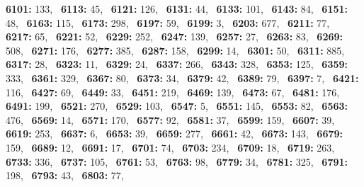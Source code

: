 \textbf{6101:} 133,\allowbreak~ 
\textbf{6113:} 45,\allowbreak~ 
\textbf{6121:} 126,\allowbreak~ 
\textbf{6131:} 44,\allowbreak~ 
\textbf{6133:} 101,\allowbreak~ 
\textbf{6143:} 84,\allowbreak~ 
\textbf{6151:} 48,\allowbreak~ 
\textbf{6163:} 115,\allowbreak~ 
\textbf{6173:} 298,\allowbreak~ 
\textbf{6197:} 59,\allowbreak~ 
\textbf{6199:} 3,\allowbreak~ 
\textbf{6203:} 677,\allowbreak~ 
\textbf{6211:} 77,\allowbreak~ 
\textbf{6217:} 65,\allowbreak~ 
\textbf{6221:} 52,\allowbreak~ 
\textbf{6229:} 252,\allowbreak~ 
\textbf{6247:} 139,\allowbreak~ 
\textbf{6257:} 27,\allowbreak~ 
\textbf{6263:} 83,\allowbreak~ 
\textbf{6269:} 508,\allowbreak~ 
\textbf{6271:} 176,\allowbreak~ 
\textbf{6277:} 385,\allowbreak~ 
\textbf{6287:} 158,\allowbreak~ 
\textbf{6299:} 14,\allowbreak~ 
\textbf{6301:} 50,\allowbreak~ 
\textbf{6311:} 885,\allowbreak~ 
\textbf{6317:} 28,\allowbreak~ 
\textbf{6323:} 11,\allowbreak~ 
\textbf{6329:} 24,\allowbreak~ 
\textbf{6337:} 266,\allowbreak~ 
\textbf{6343:} 328,\allowbreak~ 
\textbf{6353:} 125,\allowbreak~ 
\textbf{6359:} 333,\allowbreak~ 
\textbf{6361:} 329,\allowbreak~ 
\textbf{6367:} 80,\allowbreak~ 
\textbf{6373:} 34,\allowbreak~ 
\textbf{6379:} 42,\allowbreak~ 
\textbf{6389:} 79,\allowbreak~ 
\textbf{6397:} 7,\allowbreak~ 
\textbf{6421:} 116,\allowbreak~ 
\textbf{6427:} 69,\allowbreak~ 
\textbf{6449:} 33,\allowbreak~ 
\textbf{6451:} 219,\allowbreak~ 
\textbf{6469:} 139,\allowbreak~ 
\textbf{6473:} 67,\allowbreak~ 
\textbf{6481:} 176,\allowbreak~ 
\textbf{6491:} 199,\allowbreak~ 
\textbf{6521:} 270,\allowbreak~ 
\textbf{6529:} 103,\allowbreak~ 
\textbf{6547:} 5,\allowbreak~ 
\textbf{6551:} 145,\allowbreak~ 
\textbf{6553:} 82,\allowbreak~ 
\textbf{6563:} 476,\allowbreak~ 
\textbf{6569:} 14,\allowbreak~ 
\textbf{6571:} 170,\allowbreak~ 
\textbf{6577:} 92,\allowbreak~ 
\textbf{6581:} 37,\allowbreak~ 
\textbf{6599:} 159,\allowbreak~ 
\textbf{6607:} 39,\allowbreak~ 
\textbf{6619:} 253,\allowbreak~ 
\textbf{6637:} 6,\allowbreak~ 
\textbf{6653:} 39,\allowbreak~ 
\textbf{6659:} 277,\allowbreak~ 
\textbf{6661:} 42,\allowbreak~ 
\textbf{6673:} 143,\allowbreak~ 
\textbf{6679:} 159,\allowbreak~ 
\textbf{6689:} 12,\allowbreak~ 
\textbf{6691:} 17,\allowbreak~ 
\textbf{6701:} 74,\allowbreak~ 
\textbf{6703:} 234,\allowbreak~ 
\textbf{6709:} 18,\allowbreak~ 
\textbf{6719:} 263,\allowbreak~ 
\textbf{6733:} 336,\allowbreak~ 
\textbf{6737:} 105,\allowbreak~ 
\textbf{6761:} 53,\allowbreak~ 
\textbf{6763:} 98,\allowbreak~ 
\textbf{6779:} 34,\allowbreak~ 
\textbf{6781:} 325,\allowbreak~ 
\textbf{6791:} 198,\allowbreak~ 
\textbf{6793:} 43,\allowbreak~ 
\textbf{6803:} 77,\allowbreak~ 
